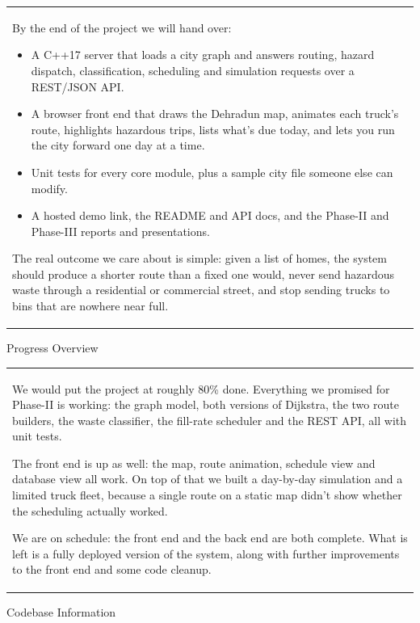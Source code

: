 \documentclass[12pt,a4paper]{article}
\newcommand{\sectiontitle}[1]{%
    {\color{GEUBlue}
    \fontsize{18}{22}\selectfont #1}
}
\newcommand{\answerbox}[2]{%
    \begin{tabularx}{\textwidth}{
        |>{\raggedright\arraybackslash}X|}
        \hline
        \parbox[t][#1][t]{\dimexpr\linewidth-12pt\relax}{
            \vspace{5pt}
            \fontsize{11}{13.5}\selectfont
            \setlength{\parskip}{4pt}
            #2
        }\\
        \hline
    \end{tabularx}
}
\begin{document}
\answerbox{6.7cm}{By the end of the project we will hand over:
\begin{itemize}
\item A C++17 server that loads a city graph and answers routing, hazard dispatch, classification, scheduling and simulation requests over a REST/JSON API.
\item A browser front end that draws the Dehradun map, animates each truck's route, highlights hazardous trips, lists what's due today, and lets you run the city forward one day at a time.
\item Unit tests for every core module, plus a sample city file someone else can modify.
\item A hosted demo link, the README and API docs, and the Phase-II and Phase-III reports and presentations.
\end{itemize}
The real outcome we care about is simple: given a list of homes, the system should produce a shorter route than a fixed one would, never send hazardous waste through a residential or commercial street, and stop sending trucks to bins that are nowhere near full.}

\vspace{0.35cm}

\sectiontitle{Progress Overview}

\vspace{0.05cm}


\vspace{0.10cm}

\answerbox{4.9cm}{We would put the project at roughly 80\% done. Everything we promised for Phase-II is working: the graph model, both versions of Dijkstra, the two route builders, the waste classifier, the fill-rate scheduler and the REST API, all with unit tests.

The front end is up as well: the map, route animation, schedule view and database view all work. On top of that we built a day-by-day simulation and a limited truck fleet, because a single route on a static map didn't show whether the scheduling actually worked.

We are on schedule: the front end and the back end are both complete. What is left is a fully deployed version of the system, along with further improvements to the front end and some code cleanup.}

\newpage

\sectiontitle{Codebase Information}

\vspace{0.05cm}
\end{document}
